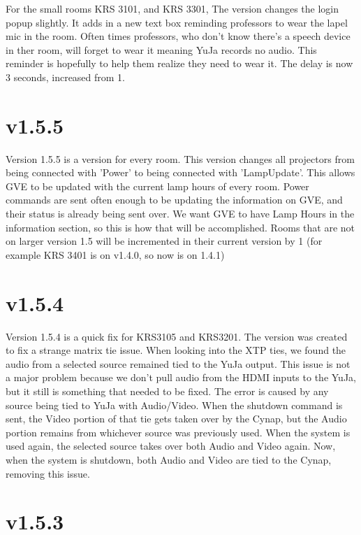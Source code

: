 \documentclass{article}
\begin{document}
For the small rooms KRS 3101, and KRS 3301, The version changes the login popup slightly. It adds in a new text box reminding 
professors to wear the lapel mic in the room. Often times professors, who don't know there's a speech device in ther room, 
will forget to wear it meaning YuJa records no audio. This reminder is hopefully to help them realize they need to wear it. 
The delay is now 3 seconds, increased from 1. 

\section*{v1.5.5}

Version 1.5.5 is a version for every room. This version changes all projectors from being connected with 'Power' to 
being connected with 'LampUpdate'. This allows GVE to be updated with the current lamp hours of every room. Power commands 
are sent often enough to be updating the information on GVE, and their status is already being sent over. We want GVE to have 
Lamp Hours in the information section, so this is how that will be accomplished. Rooms that are not on larger version 1.5 will 
be incremented in their current version by 1 (for example KRS 3401 is on v1.4.0, so now is on 1.4.1)

\section*{v1.5.4}

Version 1.5.4 is a quick fix for KRS3105 and KRS3201. The version was created to fix a strange matrix tie issue. When looking
into the XTP ties, we found the audio from a selected source remained tied to the YuJa output. This issue is not a major problem 
because we don't pull audio from the HDMI inputs to the YuJa, but it still is something that needed to be fixed. The error is caused
by any source being tied to YuJa with Audio/Video. When the shutdown command is sent, the Video portion of that tie gets taken 
over by the Cynap, but the Audio portion remains from whichever source was previously used. When the system is used again, the 
selected source takes over both Audio and Video again. Now, when the system is shutdown, both Audio and Video are tied to the Cynap,
removing this issue. 

\section*{v1.5.3}
\end{document}
